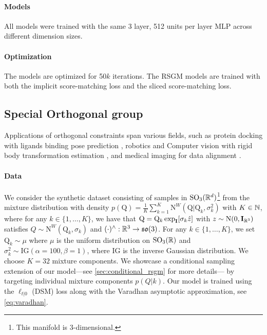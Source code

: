 \paragraph{Models}

All models were trained with the same 3 layer, 512 units per layer MLP across different dimension sizes.

\paragraph{Optimization}

The models are optimized for 50\(k\) iterations.
The RSGM models are trained with both the implicit score-matching loss and the sliced score-matching loss.

\subsection{Special Orthogonal group}

Applications of orthogonal constraints span various fields, such as protein docking with ligands binding pose prediction \parencite{ganea2022independent}, robotics and Computer vision with rigid body transformation estimation \parencite{barfoot2011Pose,deepdirectstat2018}, and medical imaging for data alignment \parencite{hou2018Computinga}.

\paragraph{Data}
We consider the synthetic dataset consisting of samples in \(\mathrm{SO}_3(\mathbb{R}^d)\)\footnote{This manifold is \(3\)-dimensional.
} from the
mixture distribution with density
\(p(\mathrm{Q})=\frac{1}{K} \sum_{k=1}^K
	\mathrm{N}^W(\mathrm{Q}|\mathrm{Q}_k,\sigma_k^2)\) with \(K \in \mathbb{N}\),
where for any \(k \in \{1, \dots, K\}\), we have that
\(\mathrm{Q} = \mathrm{Q}_k\exp_{\m{I}}[\sigma_k \hat{z}]\) with
\(z \sim \mathrm{N}(0, \m{I}_{\R^3})\) satisfies
\(Q \sim \mathrm{N}^W(\mathrm{Q}_k, \sigma_k)\) and \((\cdot)^{\wedge} : \mathbb{R}^3 \rightarrow \mathfrak{so}(3)\).
For any \(k \in \{1, \dots, K\}\), we set \(\mathrm{Q}_k \sim \mu\) where \(\mu\) is the uniform distribution on \(\mathrm{SO}_3(\mathbb{R})\) and \(\sigma_k^2 \sim \mathrm{IG}(\alpha=100, \beta=1)\), where \(\mathrm{IG}\) is the inverse Gaussian distribution.
We choose \(K=32\) mixture components.
We showcase a conditional sampling extension of our model---see \cref{sec:conditional_rsgm} for more details--- by targeting individual mixture components \(p(Q|k)\).
Our model is trained using the \(\ell_{t|0}\) (DSM) loss along with the Varadhan asymptotic approximation, see \eqref{eq:varadhan}.

